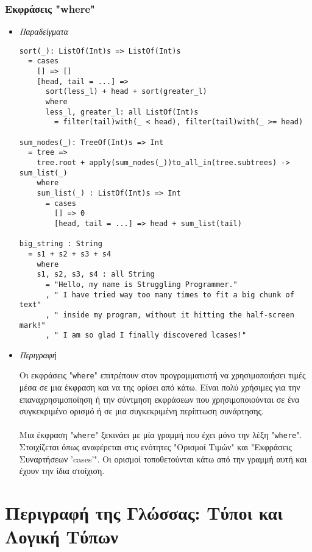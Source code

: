 \documentclass[diploma]{softlab-thesis}
\begin{document}
\newpage

\subsection{Εκφράσεις "where"}

\begin{itemize}

\item \textit{Παραδείγματα}
\begin{verbatim}
sort(_): ListOf(Int)s => ListOf(Int)s
  = cases
    [] => []
    [head, tail = ...] =>
      sort(less_l) + head + sort(greater_l)
      where
      less_l, greater_l: all ListOf(Int)s
        = filter(tail)with(_ < head), filter(tail)with(_ >= head)

sum_nodes(_): TreeOf(Int)s => Int
  = tree =>
    tree.root + apply(sum_nodes(_))to_all_in(tree.subtrees) -> sum_list(_)
    where
    sum_list(_) : ListOf(Int)s => Int
      = cases
        [] => 0
        [head, tail = ...] => head + sum_list(tail)

big_string : String
  = s1 + s2 + s3 + s4
    where
    s1, s2, s3, s4 : all String
      = "Hello, my name is Struggling Programmer."
      , " I have tried way too many times to fit a big chunk of text"
      , " inside my program, without it hitting the half-screen mark!"
      , " I am so glad I finally discovered lcases!"
\end{verbatim}

\item \textit{Περιγραφή}

Οι εκφράσεις "\verb|where|" επιτρέπουν στον προγραμματιστή να χρησιμοποιήσει
τιμές μέσα σε μια έκφραση και να της ορίσει από κάτω. Είναι πολύ χρήσιμες
για την επαναχρησιμοποίηση ή την σύντμηση εκφράσεων που χρησιμοποιούνται
σε ένα συγκεκριμένο ορισμό ή σε μια συγκεκριμένη περίπτωση συνάρτησης.
\\\\
Μια έκφραση "\verb|where|" ξεκινάει με μία γραμμή που έχει μόνο την λέξη
"\verb|where|". Στοιχίζεται όπως αναφέρεται στις ενότητες "Ορισμοί Τιμών"
και "Εκφράσεις Συναρτήσεων 'cases'". Οι ορισμοί τοποθετούνται κάτω από
την γραμμή αυτή και έχουν την ίδια στοίχιση.

\end{itemize}

\chapter{Περιγραφή της Γλώσσας: Τύποι και Λογική Τύπων}
\end{document}
